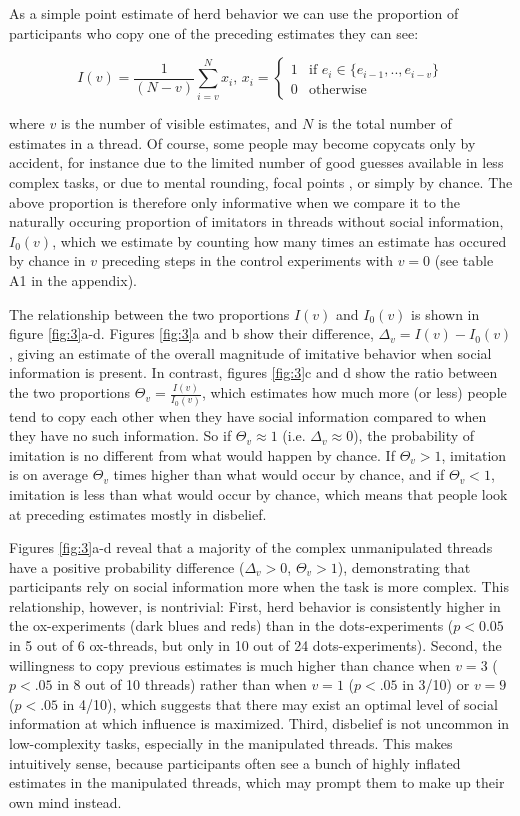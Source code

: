\documentclass[10pt,a4paper,twocolumn,lineno]{article}
\begin{document}
As a simple point estimate of herd behavior we can use the proportion of participants who copy one of the preceding estimates they can see:

$$
I(v)=\frac{1}{(N-v)} \sum_{i=v}^N  x_i \text{, } x_i=
\begin{cases}
  1 & \text{if } e_i \in \{e_{i-1},..,e_{i-v}\} \\    
  0 & \text{otherwise }
\end{cases}
$$

\noindent
where $v$ is the number of visible estimates, and $N$ is the total number of estimates in a thread. Of course, some people may become copycats only by accident, for instance due to the limited number of good guesses available in less complex tasks, or due to mental rounding, focal points \cite{schelling1980strategy}, or simply by chance. The above proportion is therefore only informative when we compare it to the naturally occuring proportion of imitators in threads without social information, $I_0(v)$, which we estimate by counting how many times an estimate has occured by chance in $v$ preceding steps in the control experiments with $v=0$ (see table A1 in the appendix). 

The relationship between the two proportions $I(v)$ and $I_0(v)$ is shown in figure \ref{fig:3}a-d. Figures \ref{fig:3}a and b show their difference,  $\Delta_v = I(v) - I_0(v)$, giving an estimate of the overall magnitude of imitative behavior when social information is present. In contrast, figures \ref{fig:3}c and d show the ratio between the two proportions $\Theta_v = \frac{I(v)}{I_0(v)}$, which estimates how much more (or less) people tend to copy each other when they have social information compared to when they have no such information. So if $\Theta_v \approx 1$ (i.e.  $\Delta_v \approx 0$), the probability of imitation is no different from what would happen by chance. If  $\Theta_v >1$, imitation is on average $\Theta_v$ times higher than what would occur by chance, and if $\Theta_v <1$, imitation is less than what would occur by chance, which means that people look at preceding estimates mostly in disbelief.

Figures \ref{fig:3}a-d reveal that a majority of the complex unmanipulated threads have a positive probability difference ($\Delta_v >0$, $\Theta_v>1$), demonstrating that participants rely on social information more when the task is more complex. This relationship, however, is nontrivial: First, herd behavior is consistently higher in the ox-experiments (dark blues and reds) than in the dots-experiments ($p<0.05$ in 5 out of 6 ox-threads, but only in 10 out of 24 dots-experiments). Second, the willingness to copy previous estimates is much higher than chance when $v=3$ ($\mathit{p}<.05$ in 8 out of 10 threads) rather than when $v=1$ ($\mathit{p}<.05$ in 3/10) or $v=9$ ($\mathit{p}<.05$ in 4/10), which suggests that there may exist an optimal level of social information at which influence is maximized. Third, disbelief is not uncommon in low-complexity tasks, especially in the manipulated threads. This makes intuitively sense, because participants often see a bunch of highly inflated estimates in the manipulated threads, which may prompt them to make up their own mind instead.
\end{document}
